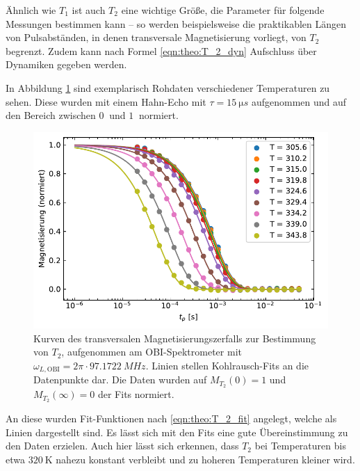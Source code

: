 \par\bigskip


Ähnlich wie $T_1$ ist auch $T_2$ eine wichtige Größe, die Parameter für folgende Messungen bestimmen kann -- so werden beispielsweise die praktikablen Längen von Pulsabständen, in denen transversale Magnetisierung vorliegt, von $T_2$ begrenzt. Zudem kann nach Formel \eqref{eqn:theo:T_2_dyn} Aufschluss über Dynamiken gegeben werden.

In Abbildung \ref{fig:res:T_2_roh} sind exemplarisch Rohdaten verschiedener Temperaturen zu sehen. Diese wurden mit einem Hahn-Echo mit $\tau = \SI{15}{\micro s}$ aufgenommen und auf den Bereich zwischen $\SI{0}{}$ und $\SI{1}{}$ normiert.
\begin{figure}
	\begin{center}
		\includegraphics[width=.8\textwidth]{graphics/plot/t2_roh3.pdf}
	\end{center}
	\caption{Kurven des transversalen Magnetisierungszerfalls zur Bestimmung von $T_2$, aufgenommen am OBI-Spektrometer mit $\omega_{L, \text{OBI}} = 2\pi \cdot \SI{97.1722}{MHz}$. Linien stellen Kohlrausch-Fits an die Datenpunkte dar. Die Daten wurden auf $M_{T_2}(0) = 1$ und $M_{T_2}(\infty) = 0$ der Fits normiert.} \label{fig:res:T_2_roh}
\end{figure}
An diese wurden Fit-Funktionen nach \eqref{eqn:theo:T_2_fit} angelegt, welche als Linien dargestellt sind. Es lässt sich mit den Fits eine gute Übereinstimmung zu den Daten erzielen. Auch hier lässt sich erkennen, dass $T_2$ bei Temperaturen bis etwa $\SI{320}{\kelvin}$ nahezu konstant verbleibt und zu hoheren Temperaturen kleiner wird.

